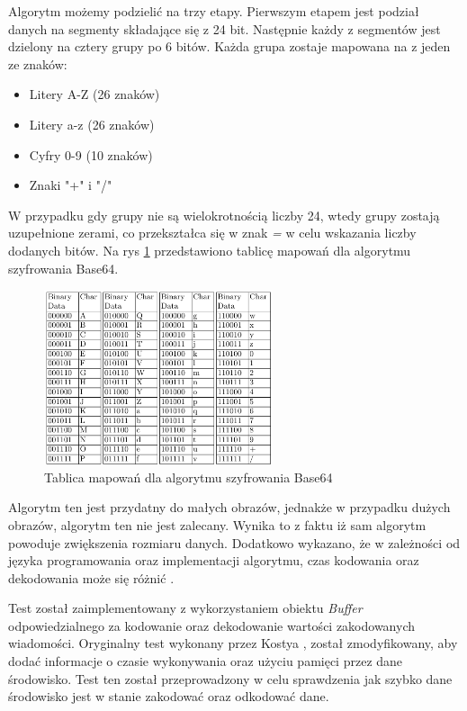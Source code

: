 Algorytm możemy podzielić na trzy etapy. Pierwszym etapem jest podział danych na segmenty składające się z 24 bit. Następnie każdy z segmentów jest dzielony na cztery grupy po 6 bitów. Każda grupa zostaje mapowana na z jeden ze znaków:
\begin{itemize}
  \item Litery A-Z (26 znaków)
  \item Litery a-z (26 znaków)
  \item Cyfry 0-9 (10 znaków)
  \item Znaki "+" i "/"
\end{itemize}
W przypadku gdy grupy nie są wielokrotnością liczby 24, wtedy grupy zostają uzupełnione zerami, co przekształca się w znak \textit{=} w celu wskazania liczby dodanych bitów. Na rys \ref{fig:base64_mapping_table} przedstawiono tablicę mapowań dla algorytmu szyfrowania Base64.

\begin{figure}[H]
  \centering
  \includegraphics[width=0.6\textwidth]{Figures/base64_mapping_table.png}
  \caption{Tablica mapowań dla algorytmu szyfrowania Base64}
  \label{fig:base64_mapping_table}
\end{figure}

Algorytm ten jest przydatny do małych obrazów, jednakże w przypadku dużych obrazów, algorytm ten nie jest zalecany. Wynika to z faktu iż sam algorytm powoduje zwiększenia rozmiaru danych. Dodatkowo wykazano, że w zależności od języka programowania oraz implementacji algorytmu, czas kodowania oraz dekodowania może się różnić \cite{cryptoeprint:2022/361}.

Test został zaimplementowany z wykorzystaniem obiektu \textit{Buffer} odpowiedzialnego za kodowanie oraz dekodowanie wartości zakodowanych wiadomości. Oryginalny test wykonany przez Kostya \cite{base64_benchmark}, został zmodyfikowany, aby dodać informacje o czasie wykonywania oraz użyciu pamięci przez dane środowisko. Test ten został przeprowadzony w celu sprawdzenia jak szybko dane środowisko jest w stanie zakodować oraz odkodować dane.

